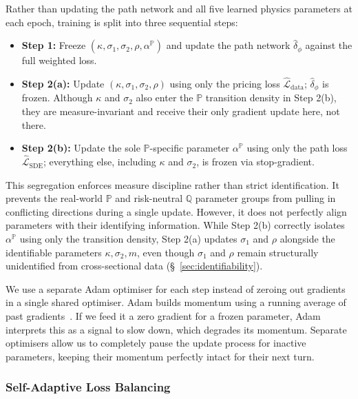 \documentclass[11pt, a4paper]{article}
\begin{document}
Rather than updating the path network and all five learned physics
parameters at each epoch, training is split into three sequential steps:
\begin{itemize}
    \item \textbf{Step 1:} Freeze $(\kappa, \sigma_1, \sigma_2, \rho,
    \alpha^{\mathbb{P}})$ and update the path network $\hat{\delta}_{\phi}$
    against the full weighted loss.
    \item \textbf{Step 2(a):} Update $(\kappa, \sigma_1, \sigma_2, \rho)$
    using only the pricing loss $\hat{\mathcal{L}}_{\text{data}}$;
    $\hat{\delta}_{\phi}$ is frozen. Although $\kappa$ and $\sigma_2$ also
    enter the $\mathbb{P}$ transition density in Step 2(b), they are
    measure-invariant and receive their only gradient update here, not there.
    \item \textbf{Step 2(b):} Update the sole $\mathbb{P}$-specific parameter
    $\alpha^{\mathbb{P}}$ using only the path loss
    $\hat{\mathcal{L}}_{\text{SDE}}$; everything else, including $\kappa$ and
    $\sigma_2$, is frozen via stop-gradient.
\end{itemize}
This segregation enforces measure discipline rather than strict identification. It prevents the real-world $\mathbb{P}$ and risk-neutral $\mathbb{Q}$ parameter groups from pulling in conflicting directions during a single update. However, it does not perfectly align parameters with their identifying information. While Step 2(b) correctly isolates $\alpha^{\mathbb{P}}$ using only the transition density, Step 2(a) updates $\sigma_1$ and $\rho$ alongside the identifiable parameters $\kappa, \sigma_2, m$, even though $\sigma_1$ and $\rho$ remain structurally unidentified from cross-sectional data (\S~\ref{sec:identifiability}).

We use a separate Adam optimiser for each step instead of zeroing out gradients in a single shared optimiser. Adam builds momentum using a running average of past gradients~\cite{kingma2014adam}. If we feed it a zero gradient for a frozen parameter, Adam interprets this as a signal to slow down, which degrades its momentum. Separate optimisers allow us to completely pause the update process for inactive parameters, keeping their momentum perfectly intact for their next turn.

\subsubsection{Self-Adaptive Loss Balancing}
\label{sec:loss_bal}
\end{document}
